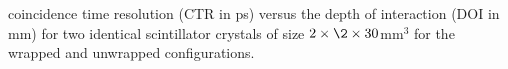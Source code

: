 \label{fig:ctrvsdoi} coincidence time resolution (CTR in ps) versus the depth of interaction (DOI in mm) for two identical scintillator crystals of size $2\times\2\times30$mm$^3$ for the wrapped and unwrapped configurations.